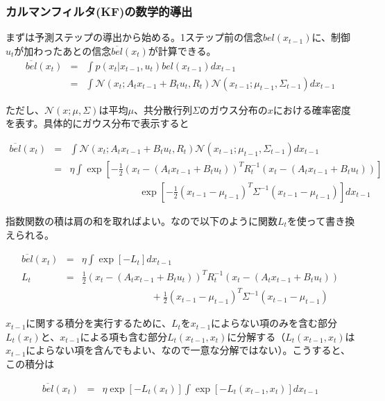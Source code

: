 \documentclass{jarticle}
\begin{document}
 
\setcounter{section}{3}
\setcounter{subsection}{2}
\setcounter{subsubsection}{3}
\subsubsection{カルマンフィルタ(KF)の数学的導出}
まずは予測ステップの導出から始める。1ステップ前の信念$bel(x_{t-1})$に、制御$u_t$が加わったあとの信念$\overline{bel}(x_t) $が計算できる。
\begin{eqnarray}
\overline{bel}(x_t) &=& \int p(x_t | x_{t-1}, u_t) bel(x_{t-1}) dx_{t-1} \\
&=&\int \mathcal{N}(x_t; A_t x_{t-1} + B_t u_t, R_t) \mathcal{N}(x_{t-1}; \mu _{t-1}, \Sigma _{t-1}) dx_{t-1}
\end{eqnarray}

ただし、$ \mathcal{N}(x; \mu, \Sigma )$は平均$\mu$、共分散行列$\Sigma$のガウス分布の$x$における確率密度を表す。具体的にガウス分布で表示すると

\begin{eqnarray}
\overline{bel}(x_t) &=&\int \mathcal{N}(x_t; A_t x_{t-1} + B_t u_t, R_t) \mathcal{N}(x_{t-1}; \mu _{t-1}, \Sigma _{t-1}) dx_{t-1}\\
&=& \eta \int \exp[-\frac{1}{2}(x_t - (A_t x_{t-1} + B_t u_t))^T R_t ^{-1}(x_t - (A_t x_{t-1} + B_t u_t)) ] \nonumber \\
&& \hspace{3cm} \exp[-\frac{1}{2} (x_{t-1}-\mu _{t-1})^T  \Sigma ^{-1}  (x_{t-1}-\mu _{t-1})]dx_{t-1}
\end{eqnarray}

指数関数の積は肩の和を取ればよい。なので以下のように関数$L_t$を使って書き換えられる。

\begin{eqnarray}
\overline{bel}(x_t) &=& \eta \int \exp[-L_t] dx_{t-1}\\
 L_t &=&\frac{1}{2}(x_t - (A_t x_{t-1} + B_t u_t))^T R_t ^{-1}(x_t - (A_t x_{t-1} + B_t u_t)) \nonumber  \\
 && \hspace{3cm}+\frac{1}{2} (x_{t-1}-\mu _{t-1})^T  \Sigma ^{-1}  (x_{t-1}-\mu _{t-1})
\end{eqnarray}

$x_{t-1}$に関する積分を実行するために、$L_t$を$x_{t-1}$によらない項のみを含む部分$L_t (x_t)$と、$x_{t-1}$による項も含む部分$L_t (x_{t-1},x_t)$に分解する（$L_t (x_{t-1},x_t)$は$x_{t-1}$によらない項を含んでもよい、なので一意な分解ではない）。こうすると、この積分は

\begin{eqnarray}
\overline{bel}(x_t) &=& \eta \exp[-L_t (x_t)]  \int \exp [-L_t (x_{t-1},x_t)]dx_{t-1}\\
\end{eqnarray}
\end{document}
